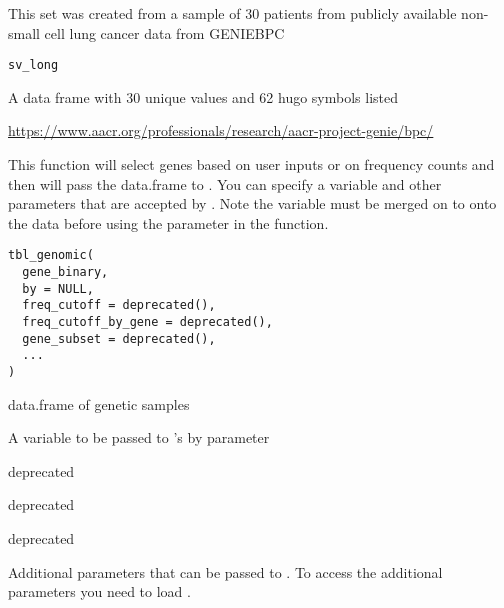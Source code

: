 \documentclass[a4paper]{book}
\begin{document}
%
\begin{Description}\relax
This set was created from a sample of 30 patients from publicly available
non-small cell lung cancer data from GENIEBPC 
\end{Description}
%
\begin{Usage}
\begin{verbatim}
sv_long
\end{verbatim}
\end{Usage}
%
\begin{Format}
A data frame with 30 unique  values and 62 hugo symbols listed
\end{Format}
%
\begin{Source}\relax
\url{https://www.aacr.org/professionals/research/aacr-project-genie/bpc/}
\end{Source}
%
\begin{Description}\relax
This function will select genes based on user inputs or on frequency counts and then
will pass the data.frame to . You can specify a  variable and other
parameters that are accepted by . Note the  variable must be merged on to
onto the data before using the  parameter in the function.
\end{Description}
%
\begin{Usage}
\begin{verbatim}
tbl_genomic(
  gene_binary,
  by = NULL,
  freq_cutoff = deprecated(),
  freq_cutoff_by_gene = deprecated(),
  gene_subset = deprecated(),
  ...
)
\end{verbatim}
\end{Usage}
%
\begin{Arguments}
\begin{ldescription}
\item[\code{gene\_binary}] data.frame of genetic samples

\item[\code{by}] A variable to be passed to 's by parameter

\item[\code{freq\_cutoff}] deprecated

\item[\code{freq\_cutoff\_by\_gene}] deprecated

\item[\code{gene\_subset}] deprecated

\item[\code{...}] Additional parameters that can be passed to . To access the additional parameters you need to load .
\end{ldescription}
\end{Arguments}
\end{document}
